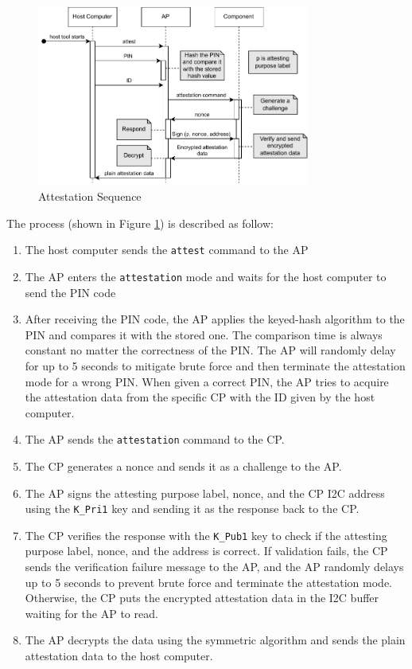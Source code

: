 \documentclass[11pt,oneside,onecolumn,letterpaper]{article}
\newcounter{alg}
\begin{document}
	\begin{figure}[h]
		\centering
		\includegraphics[width=0.8\textwidth]{pics/attest.pdf}
		\caption{Attestation Sequence}
		\label{fig:functionality_attest}
	\end{figure}
	
	The process (shown in Figure \ref{fig:functionality_attest}) is described as follow:
	\begin{enumerate}
		\item The host computer sends the \texttt{attest} command to the AP
		\item The AP enters the \texttt{attestation} mode and waits for the host computer to send the PIN code
		\item After receiving the PIN code,
		the AP applies the keyed-hash algorithm to the PIN and compares it with the stored one.
		The comparison time is always constant no matter the correctness of the PIN.
		The AP will randomly delay for up to 5 seconds to mitigate brute force and then terminate the attestation mode for a wrong PIN.
		When given a correct PIN,
		the AP tries to acquire the attestation data from the specific CP with the ID given by the host computer.
		\item The AP sends the \texttt{attestation} command to the CP.
		\item The CP generates a nonce and sends it as a challenge to the AP.
		\item The AP signs the attesting purpose label,
		nonce,
		and the CP I2C address using the \texttt{K\_Pri1} key and sending it as the response back to the CP.
		\item The CP verifies the response with the \texttt{K\_Pub1} key to check if the attesting purpose label,
		nonce,
		and the address is correct.
		If validation fails,
		the CP sends the verification failure message to the AP,
		and the AP randomly delays up to 5 seconds to prevent brute force and terminate the attestation mode.
		Otherwise,
		the CP puts the encrypted attestation data in the I2C buffer waiting for the AP to read.
		\item The AP decrypts the data using the symmetric algorithm and sends the plain attestation data to the host computer.
	\end{enumerate}
	
\end{document}

